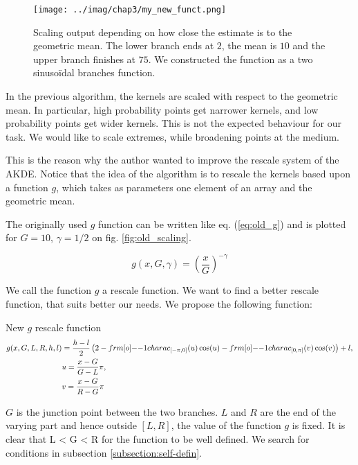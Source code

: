\documentclass[11pt]{book}
\begin{document}
\begin{figure}
\centering
\texttt{[image: ../imag/chap3/my\_new\_funct.png]}
\caption{Scaling output depending on how close the estimate is to the geometric mean. The lower branch ends at $2$, the mean is $10$ and the upper branch finishes at $75$. We constructed the function as a two sinusoïdal branches function.}
\label{fig:new_scaling}
\end{figure}

In the previous algorithm, the kernels are scaled with respect to the geometric mean. In particular, high probability points get narrower kernels, and low probability points get wider kernels. This is not the expected behaviour for our task. We would like to scale extremes, while broadening points at the medium.



This is the reason why the author wanted to improve the rescale system of the AKDE. Notice that the idea of the algorithm is to rescale the kernels based upon a function $g$, which takes as parameters one element of an array and the geometric mean. 

The originally used $g$ function can be written like eq. (\ref{eq:old_g}) and is plotted for $G = 10$, $\gamma = 1/2$ on fig. \ref{fig:old_scaling}. 

\begin{equation}
\label{eq:old_g}
g(x,G, \gamma) =  \left ( \frac x G \right ) ^{-\gamma}
\end{equation}

We call the function $g$ a rescale function. We want to find a better rescale function, that suits better our needs. We propose the following function:


\begin{theoreme}[label = thrm:new_g]{New $g$ rescale function}
\begin{align}
\label{eq:new_g}
g(x, G, L,R,h,l) &=   \frac {h-l} 2 \left (2 
-  \11charac_{ [- \pi, 0]} (u)  \cos(u)
-  \11charac_{ [0, \pi]} (v)  \cos(v) \right ) + l,  \\
\quad & u = \frac{x - G}{G- L} \pi, \notag  \\
\quad & v = \frac{x - G}{R- G} \pi \notag
\end{align}

$G$ is the junction point between the two branches. $L$ and $R$ are the end of the varying part and hence outside $[L,R]$, the value of the function $g$ is fixed. It is clear that L < G < R for the function to be well defined. We search for conditions in subsection \ref{subsection:self-defin}.
\end{theoreme}
\end{document}
